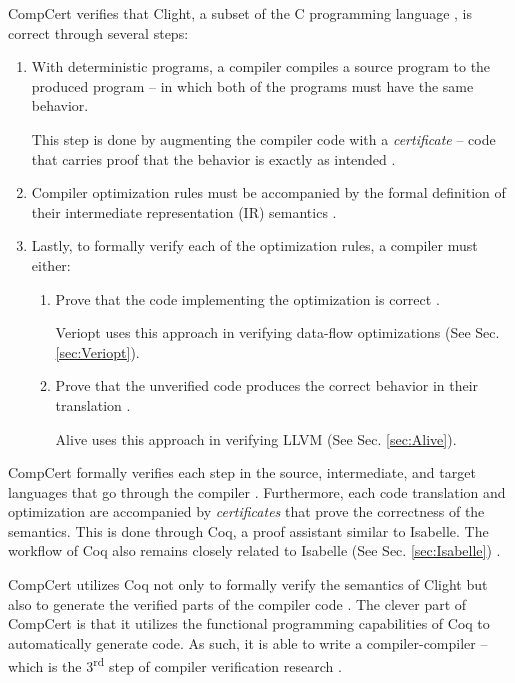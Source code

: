 CompCert verifies that Clight, a subset of the C programming language \cite{compcertVerification}, is correct through several steps:
\begin{enumerate}
    \item With deterministic programs, a compiler compiles a source program to the produced program -- in which both of the programs must have 
          the same behavior.
    
    This step is done by augmenting the compiler code with a \emph{certificate} -- code that carries proof that the behavior is exactly as intended 
    \cite[Sec. 2.2]{compcertVerification}.

    \item Compiler optimization rules must be accompanied by the formal definition of their intermediate representation (IR) semantics 
          \cite{compcertVerification,ATVA21_GraalVM_IR_Semantics}.
    
    \item Lastly, to formally verify each of the optimization rules, a compiler must either:
    \begin{enumerate}
        \item Prove that the code implementing the optimization is correct \cite[Sec. 2.4]{compcertVerification}.
        
        Veriopt uses this approach in verifying data-flow optimizations (See Sec. \ref{sec:Veriopt}).

        \item Prove that the unverified code produces the correct behavior in their translation \cite[Sec. 2.4]{compcertVerification}.

        Alive uses this approach in verifying LLVM (See Sec. \ref{sec:Alive}).
    \end{enumerate}
\end{enumerate}

CompCert formally verifies each step in the source, intermediate, and target languages that go through the compiler 
\cite[Sec. 3.3]{compcertVerification}. Furthermore, each code translation and optimization are accompanied by \emph{certificates} that prove 
the correctness of the semantics. This is done through Coq, a proof assistant similar to Isabelle. The workflow of Coq also remains closely related to 
Isabelle (See Sec. \ref{sec:Isabelle}) \cite[Sec. 3.3]{compcertVerification}. 

CompCert utilizes Coq not only to formally verify the semantics of Clight but also to generate the verified parts of the compiler code 
\cite[Sec. 3.4]{compcertVerification}. The clever part of CompCert is that it utilizes the functional programming capabilities of Coq 
to automatically generate code. As such, it is able to write a compiler-compiler -- which is the 3\textsuperscript{rd} step of compiler verification research 
\cite{CompilerOptimization}.

